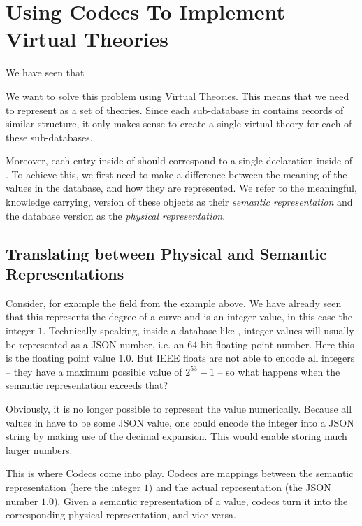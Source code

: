 \section{Using Codecs To Implement \lmfdb Virtual Theories}\label{sec:vt}

We have seen that 

We want to solve this problem using Virtual Theories. 
This means that we need to represent \lmfdb as a set of \ommt theories. 
Since each sub-database in \lmfdb contains records of similar structure, it only makes sense to create a single virtual theory for each of these sub-databases. 

Moreover, each entry inside of \lmfdb should correspond to a single declaration inside of \mmt. 
To achieve this, we first need to make a difference between the meaning of the values in the database, and how they are represented.
We refer to the meaningful, knowledge carrying, version of these objects as their \textit{semantic representation} and the database version as the \textit{physical representation}. 


\subsection{Translating between Physical and Semantic Representations}\label{sec:vt:translation}

Consider, for example the  field from the example above. 
We have already seen that this represents the degree of a curve and is an integer value, in this case the integer $1$. 
Technically speaking, inside a database like \lmfdb, integer values will usually be represented as a JSON number, i.e. an  $64$ bit floating point number. 
Here this is the floating point value $1.0$. 
But IEEE floats are not able to encode all integers -- they have a maximum possible value of $2^{53}-1$ -- so what happens when the semantic representation exceeds that?

Obviously, it is no longer possible to represent the value numerically. 
Because all values in \lmfdb have to be some JSON value, one could encode the integer into a JSON string by making use of the decimal expansion. 
This would enable storing much larger numbers. 

This is where Codecs come into play. 
Codecs are mappings between the semantic representation (here the integer $1$) and the actual representation (the JSON number $1.0$). 
Given a semantic representation of a value, codecs turn it into the corresponding physical representation, and vice-versa. 

